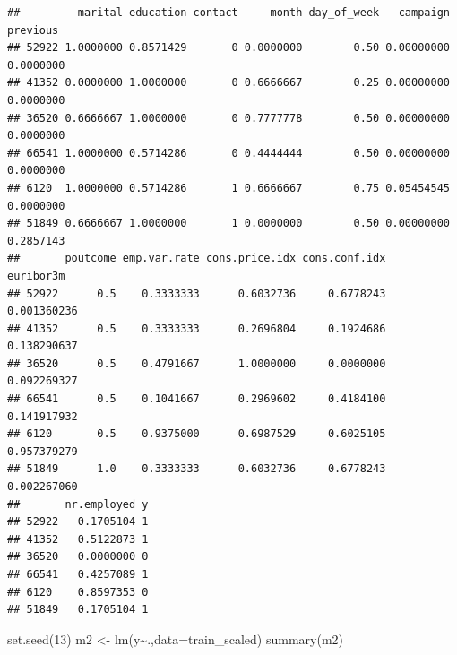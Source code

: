 \documentclass[
]{article}
\newenvironment{Shaded}{\begin{snugshade}}{\end{snugshade}}
\newcommand{\AttributeTok}[1]{\textcolor[rgb]{0.77,0.63,0.00}{#1}}
\newcommand{\DecValTok}[1]{\textcolor[rgb]{0.00,0.00,0.81}{#1}}
\newcommand{\FunctionTok}[1]{\textcolor[rgb]{0.00,0.00,0.00}{#1}}
\newcommand{\NormalTok}[1]{#1}
\newcommand{\OtherTok}[1]{\textcolor[rgb]{0.56,0.35,0.01}{#1}}
\newcommand{\SpecialCharTok}[1]{\textcolor[rgb]{0.00,0.00,0.00}{#1}}
\begin{document}
\begin{verbatim}
##         marital education contact     month day_of_week   campaign  previous
## 52922 1.0000000 0.8571429       0 0.0000000        0.50 0.00000000 0.0000000
## 41352 0.0000000 1.0000000       0 0.6666667        0.25 0.00000000 0.0000000
## 36520 0.6666667 1.0000000       0 0.7777778        0.50 0.00000000 0.0000000
## 66541 1.0000000 0.5714286       0 0.4444444        0.50 0.00000000 0.0000000
## 6120  1.0000000 0.5714286       1 0.6666667        0.75 0.05454545 0.0000000
## 51849 0.6666667 1.0000000       1 0.0000000        0.50 0.00000000 0.2857143
##       poutcome emp.var.rate cons.price.idx cons.conf.idx   euribor3m
## 52922      0.5    0.3333333      0.6032736     0.6778243 0.001360236
## 41352      0.5    0.3333333      0.2696804     0.1924686 0.138290637
## 36520      0.5    0.4791667      1.0000000     0.0000000 0.092269327
## 66541      0.5    0.1041667      0.2969602     0.4184100 0.141917932
## 6120       0.5    0.9375000      0.6987529     0.6025105 0.957379279
## 51849      1.0    0.3333333      0.6032736     0.6778243 0.002267060
##       nr.employed y
## 52922   0.1705104 1
## 41352   0.5122873 1
## 36520   0.0000000 0
## 66541   0.4257089 1
## 6120    0.8597353 0
## 51849   0.1705104 1
\end{verbatim}

\begin{Shaded}
\begin{Highlighting}[]
\FunctionTok{set.seed}\NormalTok{(}\DecValTok{13}\NormalTok{)}
\NormalTok{m2 }\OtherTok{\textless{}{-}} \FunctionTok{lm}\NormalTok{(y}\SpecialCharTok{\textasciitilde{}}\NormalTok{.,}\AttributeTok{data=}\NormalTok{train\_scaled)}
\FunctionTok{summary}\NormalTok{(m2)}
\end{Highlighting}
\end{Shaded}
\end{document}
